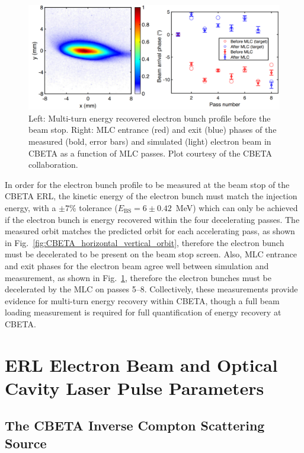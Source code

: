 \documentclass[../main.tex]{subfiles}
\begin{document}
\begin{figure}[!h]
\centering
\includegraphics[width=\textwidth]{Figures/CBETA_Multi-Pass_Commissioning/dump_beam_phases.pdf}
\caption{Left: Multi-turn energy recovered electron bunch profile before the beam stop. Right: MLC entrance (red) and exit (blue) phases of the measured (bold, error bars) and simulated (light) electron beam in CBETA as a function of MLC passes. Plot courtesy of the CBETA collaboration.}
\label{fig:CBETA_phases_dump_bunch}
\end{figure}

In order for the electron bunch profile to be measured at the beam stop of the CBETA ERL, the kinetic energy of the electron bunch must match the injection energy, with a $\pm 7$\% tolerance ($E_{\mathrm{BS}} = 6\pm 0.42$~\si{\mega\electronvolt}) which can only be achieved if the electron bunch is energy recovered within the four decelerating passes. The measured orbit matches the predicted orbit for each accelerating pass, as shown in Fig.~\ref{fig:CBETA_horizontal_vertical_orbit}, therefore the electron bunch must be decelerated to be present on the beam stop screen. Also, MLC entrance and exit phases for the electron beam agree well between simulation and measurement, as shown in Fig.~\ref{fig:CBETA_phases_dump_bunch}, therefore the electron bunches must be decelerated by the MLC on passes 5--8. Collectively, these measurements provide evidence for multi-turn energy recovery within CBETA, though a full beam loading measurement is required for full quantification of energy recovery at CBETA.

\section{ERL Electron Beam and Optical Cavity Laser Pulse Parameters}
\label{sec:CBETA_electron_laser_parameters}

\subsection{The CBETA Inverse Compton Scattering Source}
\label{sec:CBETA_ICS_source_description}
\end{document}
